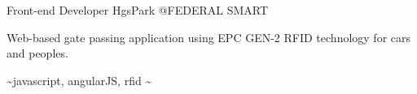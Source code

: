 \begin{cventries}
  \cventry
    {Front-end Developer} %
    {HgsPark} %
    {@FEDERAL SMART} %
    {}
    {
      \begin{cvitems} %
        \item {Web-based gate passing application using EPC GEN-2 RFID technology for cars and peoples.}
        \item {\textasciitilde javascript, angularJS, rfid \textasciitilde}
      \end{cvitems}
    }

\end{cventries}
